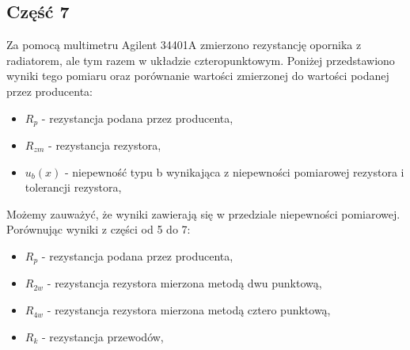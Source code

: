 \documentclass[11pt]{article}
\begin{document}
    \subsection*{Część 7}
    Za pomocą multimetru Agilent 34401A zmierzono rezystancję opornika z radiatorem, ale tym razem w układzie czteropunktowym.
    Poniżej przedstawiono wyniki tego pomiaru oraz porównanie wartości zmierzonej do wartości podanej przez producenta:
    \begin{center}
    \end{center}
    {\footnotesize
        \begin{itemize}
            \setlength\itemsep{0em}
            \item[] \boldmath$R_p$ - rezystancja podana przez producenta,
            \item[] \boldmath$R_{zm}$ - rezystancja rezystora,
            \item[] \boldmath$u_b(x)$ - niepewność typu b wynikająca z niepewności pomiarowej rezystora i tolerancji rezystora,
        \end{itemize}}
    Możemy zauważyć, że wyniki zawierają się w przedziale niepewności pomiarowej.\\
    Porównując wyniki z części od 5 do 7:
    \begin{center}
    \end{center}
    {\footnotesize
        \begin{itemize}
            \setlength\itemsep{0em}
            \item[] \boldmath$R_p$ - rezystancja podana przez producenta,
            \item[] \boldmath$R_{2w}$ - rezystancja rezystora mierzona metodą dwu punktową,
            \item[] \boldmath$R_{4w}$ - rezystancja rezystora mierzona metodą cztero punktową,
            \item[] \boldmath$R_k$ - rezystancja przewodów,
        \end{itemize}}
\end{document}
